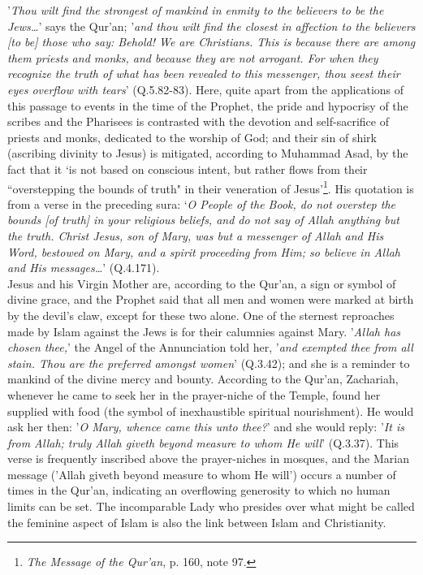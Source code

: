 \documentclass[10pt, twoside,openright]{book}
\begin{document}
'\emph{Thou wilt find the strongest of mankind in enmity to the believers to be the Jews\ldots{}}' says the 
Qur'an; '\emph{and thou wilt find the closest in affection to the believers [to be] those who say: Behold! 
We are Christians. This is because there are among them priests and monks, and because they are not 
arrogant. For when they recognize the truth of what has been revealed to this messenger, thou seest 
their eyes overflow with tears}' (Q.5.82-83). Here, quite apart from the applications of this passage 
to events in the time of the Prophet, the pride and hypocrisy of the scribes and the Pharisees is 
contrasted with the devotion and self\hyp{}sacrifice of priests and monks, dedicated to the worship of 
God; and their sin of shirk (ascribing divinity to Jesus) is mitigated, according to Muhammad Asad, 
by the fact that it `is not based on conscious intent, but rather flows from their ``overstepping the 
bounds of truth" in their veneration of Jesus'\footnote{\emph{The Message of the Qur'an}, p. 160, note 97.}. His quotation is from a verse in the preceding sura: `\emph{O People of the Book, do not overstep the bounds [of truth] in your religious beliefs, and do not say of Allah anything but the truth. Christ Jesus, son of Mary, was but a messenger of Allah and His Word, bestowed on Mary, and a spirit proceeding from Him; so believe in Allah and His messages\ldots{}}' (Q.4.171). \\

Jesus and his Virgin Mother are, according to the Qur'an, a sign or symbol of divine grace, and the 
Prophet said that all men and women were marked at birth by the devil's claw, except for these two 
alone. One of the sternest reproaches made by Islam against the Jews is for their calumnies against 
Mary. '\emph{Allah has chosen thee,}' the Angel of the Annunciation told her, '\emph{and exempted thee from all stain. Thou are the preferred amongst women}' (Q.3.42); and she is a reminder to mankind of the divine mercy and bounty. According to the Qur'an, Zachariah, whenever he came to seek her in the prayer\hyp{}niche of the Temple, found her supplied with food (the symbol of inexhaustible spiritual 
nourishment). He would ask her then: '\emph{O Mary, whence came this unto thee?}' and she would reply: '\emph{It is from Allah; truly Allah giveth beyond measure to whom He will}' (Q.3.37). This verse is frequently inscribed above the prayer\hyp{}niches in mosques, and the Marian message ('Allah giveth beyond measure to whom He will') occurs a number of times in the Qur'an, indicating an overflowing generosity to which no human limits can be set. The incomparable Lady who presides over what might be called the feminine aspect of Islam is also the link between Islam and Christianity. \\
\end{document}
